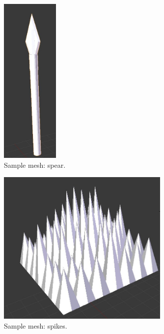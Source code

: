 \documentclass[12pt, titlepage]{article}
\begin{document}
\begin{figure}[hB]
\begin{center}
\includegraphics[width=0.25\textwidth]{spear}
\caption{Sample mesh:  spear.} \label{fig:spear}
\end{center}
\end{figure}

\begin{figure}[hB]
\begin{center}
\includegraphics[width=0.75\textwidth]{spikes}
\caption{Sample mesh:  spikes.} \label{fig:spikes}
\end{center}
\end{figure}
\end{document}

